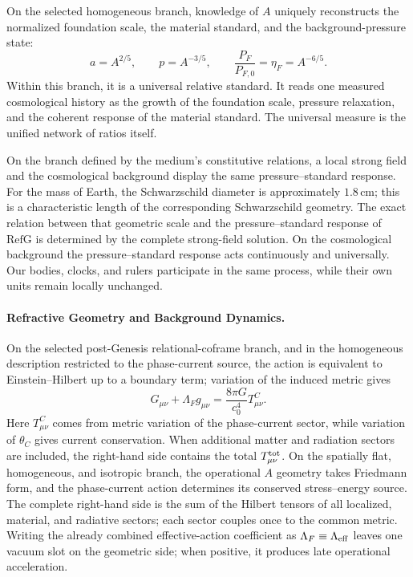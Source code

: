 \documentclass[11pt,a4paper]{article}
\newcommand{\RefG}{\mathrm{RefG}}
\begin{document}
On the selected homogeneous branch, knowledge of $A$ uniquely reconstructs the normalized foundation scale, the material standard, and the background-pressure state:
\begin{equation}
a=A^{2/5},
\qquad
p=A^{-3/5},
\qquad
\frac{P_F}{P_{F,0}}=\eta_F=A^{-6/5}.
\end{equation}
Within this branch, it is a universal relative standard. It reads one measured cosmological history as the growth of the foundation scale, pressure relaxation, and the coherent response of the material standard. The universal measure is the unified network of ratios itself.

On the branch defined by the medium's constitutive relations, a local strong field and the cosmological background display the same pressure--standard response. For the mass of Earth, the Schwarzschild diameter is approximately $1.8\,\mathrm{cm}$; this is a characteristic length of the corresponding Schwarzschild geometry. The exact relation between that geometric scale and the pressure--standard response of $\RefG$ is determined by the complete strong-field solution. On the cosmological background the pressure--standard response acts continuously and universally. Our bodies, clocks, and rulers participate in the same process, while their own units remain locally unchanged.

\paragraph{Refractive Geometry and Background Dynamics.}

On the selected post-Genesis relational-coframe branch, and in the homogeneous description restricted to the phase-current source, the action is equivalent to Einstein--Hilbert up to a boundary term; variation of the induced metric gives
\begin{equation}
G_{\mu\nu}+\Lambda_Fg_{\mu\nu}
=\frac{8\pi G}{c_0^4}T^C_{\mu\nu}.
\end{equation}
Here $T^C_{\mu\nu}$ comes from metric variation of the phase-current sector, while variation of $\theta_C$ gives current conservation. When additional matter and radiation sectors are included, the right-hand side contains the total $T^{\rm tot}_{\mu\nu}$.
On the spatially flat, homogeneous, and isotropic branch, the operational $A$ geometry takes Friedmann form, and the phase-current action determines its conserved stress--energy source. The complete right-hand side is the sum of the Hilbert tensors of all localized, material, and radiative sectors; each sector couples once to the common metric. Writing the already combined effective-action coefficient as $\Lambda_F\equiv\Lambda_{\rm eff}$ leaves one vacuum slot on the geometric side; when positive, it produces late operational acceleration.
\end{document}

